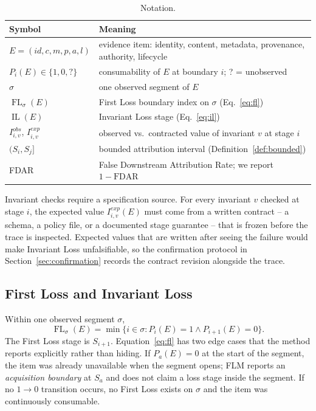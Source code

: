 \documentclass[10pt]{article}
\newcommand{\FL}{\operatorname{FL}}
\newcommand{\IL}{\operatorname{IL}}
\begin{document}
\begin{table}[t]
\centering
\caption{Notation.}
\label{tab:notation}
\begin{tabular}{ll}
\toprule
Symbol & Meaning \\
\midrule
$E=(id,c,m,p,a,l)$ & evidence item: identity, content, metadata, provenance, authority, lifecycle \\
$P_i(E)\in\{1,0,?\}$ & consumability of $E$ at boundary $i$; ? = unobserved \\
$\sigma$ & one observed segment of $E$ \\
$\FL_\sigma(E)$ & First Loss boundary index on $\sigma$ (Eq.~\eqref{eq:fl}) \\
$\IL(E)$ & Invariant Loss stage (Eq.~\eqref{eq:il}) \\
$I^{obs}_{i,v}$, $I^{exp}_{i,v}$ & observed vs.\ contracted value of invariant $v$ at stage $i$ \\
$(S_i,S_j]$ & bounded attribution interval (Definition~\ref{def:bounded}) \\
FDAR & False Downstream Attribution Rate; we report $1-\mathrm{FDAR}$ \\
\bottomrule
\end{tabular}
\end{table}

Invariant checks require a specification source. For every invariant $v$ checked at stage $i$, the expected value $I_{i,v}^{exp}(E)$ must come from a written contract -- a schema, a policy file, or a documented stage guarantee -- that is frozen before the trace is inspected. Expected values that are written after seeing the failure would make Invariant Loss unfalsifiable, so the confirmation protocol in Section~\ref{sec:confirmation} records the contract revision alongside the trace.

\subsection{First Loss and Invariant Loss}

Within one observed segment $\sigma$,
\begin{equation}
\FL_\sigma(E)=\min\{i \in \sigma : P_i(E)=1 \land P_{i+1}(E)=0\}.
\label{eq:fl}
\end{equation}
The First Loss stage is $S_{i+1}$. Equation~\eqref{eq:fl} has two edge cases that the method reports explicitly rather than hiding. If $P_a(E)=0$ at the start of the segment, the item was already unavailable when the segment opens; FLM reports an \emph{acquisition boundary} at $S_a$ and does not claim a loss stage inside the segment. If no $1\to0$ transition occurs, no First Loss exists on $\sigma$ and the item was continuously consumable.
\end{document}
